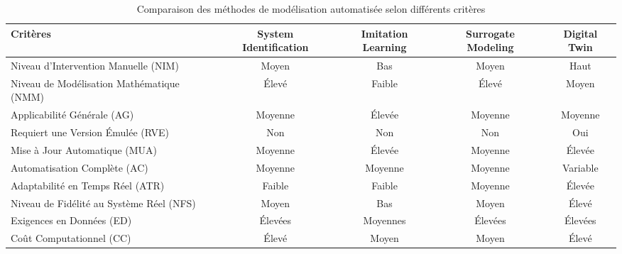 \documentclass[sigconf,anonymous]{aamas}
\begin{document}
\begin{table*}[h!]
\centering
\caption{Comparaison des méthodes de modélisation automatisée selon différents critères}
\begin{tabular}{|p{5cm}|c|c|c|c|}
\hline
\textbf{Critères}                   & \textbf{System Identification} & \textbf{Imitation Learning} & \textbf{Surrogate Modeling} & \textbf{Digital Twin} \\
\hline
Niveau d'Intervention Manuelle (NIM)    & Moyen                         & Bas                          & Moyen                       & Haut                 \\
Niveau de Modélisation Mathématique (NMM) & Élevé                         & Faible                       & Élevé                       & Moyen                \\
Applicabilité Générale (AG)             & Moyenne                       & Élevée                       & Moyenne                     & Moyenne              \\
Requiert une Version Émulée (RVE)       & Non                           & Non                          & Non                         & Oui                  \\
Mise à Jour Automatique (MUA)           & Moyenne                       & Élevée                       & Moyenne                     & Élevée               \\
Automatisation Complète (AC)            & Moyenne                       & Moyenne                      & Moyenne                     & Variable             \\
Adaptabilité en Temps Réel (ATR)        & Faible                        & Faible                       & Moyenne                     & Élevée               \\
Niveau de Fidélité au Système Réel (NFS) & Moyen                         & Bas                          & Moyen                       & Élevé                \\
Exigences en Données (ED)               & Élevées                       & Moyennes                     & Élevées                     & Élevées              \\
Coût Computationnel (CC)                & Élevé                         & Moyen                        & Moyen                       & Élevé                \\
\hline
\end{tabular}
\label{tab:comparaison-methodes}
\end{table*}
\end{document}
